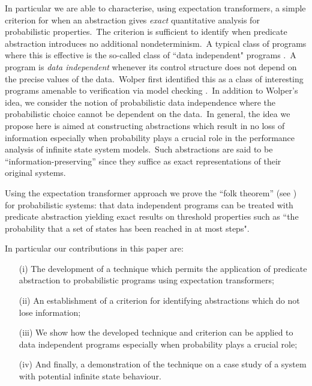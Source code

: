 \documentclass[numbers,copyright,creativecommons]{eptcs}
\begin{document}
In particular we are able to characterise, using expectation transformers, a simple criterion for when an abstraction gives \emph{exact} quantitative analysis for probabilistic properties.\ The criterion is sufficient to identify when predicate abstraction introduces no additional nondeterminism.\ A typical class of programs where this is effective is the so-called class of ``data independent" programs \cite{Wolper86}.\ A program is \emph{data independent} whenever its control structure does not depend on the precise values of the data.\ Wolper \cite{Wolper86} first identified this as a class of interesting programs amenable to verification via model checking \cite{CGP99}.\ In addition to Wolper's idea, we consider the notion of probabilistic data independence where the probabilistic choice cannot be dependent on the data.\ In general, the idea we propose here is aimed at constructing abstractions which result in no loss of information especially when probability plays a crucial role in the performance analysis of infinite state system models.\ Such abstractions are said to be ``information-preserving'' since they suffice as exact representations of their original systems.

Using the expectation transformer approach we prove the ``folk theorem'' (see \cite{FM86}) for probabilistic systems: that data independent programs can be treated with predicate abstraction yielding exact results on threshold properties such as ``the probability that a set of states has been reached in at most  steps".

In particular our contributions in this paper are:
\begin{enumerate}
\item [(i)] The development of a technique which permits the application of predicate abstraction to probabilistic programs using expectation transformers;

\item [(ii)] An establishment of a criterion for identifying abstractions which do not lose information;

\item [(iii)] We show how the developed technique and criterion can be applied to data independent programs
    especially when probability plays a crucial role;

\item [(iv)] And finally, a demonstration of the technique on a case study of a system with potential infinite state behaviour.
\end{enumerate}
\end{document}
